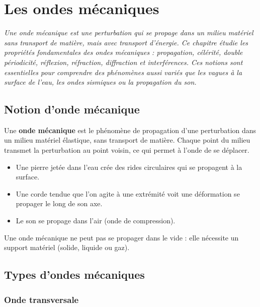 \chapter{Les ondes mécaniques}

\textit{Une onde mécanique est une perturbation qui se propage dans un milieu matériel sans transport de matière, mais avec transport d'énergie. Ce chapitre étudie les propriétés fondamentales des ondes mécaniques : propagation, célérité, double périodicité, réflexion, réfraction, diffraction et interférences. Ces notions sont essentielles pour comprendre des phénomènes aussi variés que les vagues à la surface de l'eau, les ondes sismiques ou la propagation du son.}

\section{Notion d'onde mécanique}

\begin{definition}
Une \textbf{onde mécanique} est le phénomène de propagation d'une perturbation dans un milieu matériel élastique, sans transport de matière. Chaque point du milieu transmet la perturbation au point voisin, ce qui permet à l'onde de se déplacer.
\end{definition}

\begin{exemple}
\begin{itemize}
    \item Une pierre jetée dans l'eau crée des rides circulaires qui se propagent à la surface.
    \item Une corde tendue que l'on agite à une extrémité voit une déformation se propager le long de son axe.
    \item Le son se propage dans l'air (onde de compression).
\end{itemize}
\end{exemple}

\begin{remarque}
Une onde mécanique ne peut pas se propager dans le vide : elle nécessite un support matériel (solide, liquide ou gaz).
\end{remarque}

\section{Types d'ondes mécaniques}

\subsection{Onde transversale}

